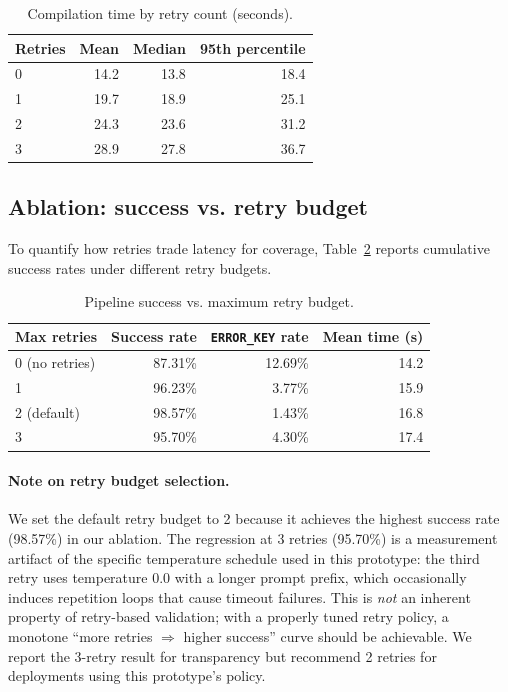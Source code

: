 \documentclass[11pt]{article}
\begin{document}
\begin{table}[h]
\centering
\caption{Compilation time by retry count (seconds).}
\label{tab:retry_time}
\begin{tabular}{lrrr}
\toprule
Retries & Mean & Median & 95th percentile \\
\midrule
0 & 14.2 & 13.8 & 18.4 \\
1 & 19.7 & 18.9 & 25.1 \\
2 & 24.3 & 23.6 & 31.2 \\
3 & 28.9 & 27.8 & 36.7 \\
\bottomrule
\end{tabular}
\end{table}

\subsection{Ablation: success vs. retry budget}
To quantify how retries trade latency for coverage, Table~\ref{tab:retry_budget} reports cumulative success rates under different retry budgets.

\begin{table}[h]
\centering
\caption{Pipeline success vs. maximum retry budget.}
\label{tab:retry_budget}
\begin{tabular}{lrrr}
\toprule
Max retries & Success rate & \texttt{ERROR\_KEY} rate & Mean time (s) \\
\midrule
0 (no retries) & 87.31\% & 12.69\% & 14.2 \\
1 & 96.23\% & 3.77\% & 15.9 \\
2 (default) & 98.57\% & 1.43\% & 16.8 \\
3 & 95.70\% & 4.30\% & 17.4 \\
\bottomrule
\end{tabular}
\end{table}

\paragraph{Note on retry budget selection.}
We set the default retry budget to 2 because it achieves the highest success rate (98.57\%) in our ablation.
The regression at 3 retries (95.70\%) is a measurement artifact of the specific temperature schedule used in this prototype: the third retry uses temperature 0.0 with a longer prompt prefix, which occasionally induces repetition loops that cause timeout failures.
This is \emph{not} an inherent property of retry-based validation; with a properly tuned retry policy, a monotone ``more retries $\Rightarrow$ higher success'' curve should be achievable.
We report the 3-retry result for transparency but recommend 2 retries for deployments using this prototype's policy.
\end{document}
